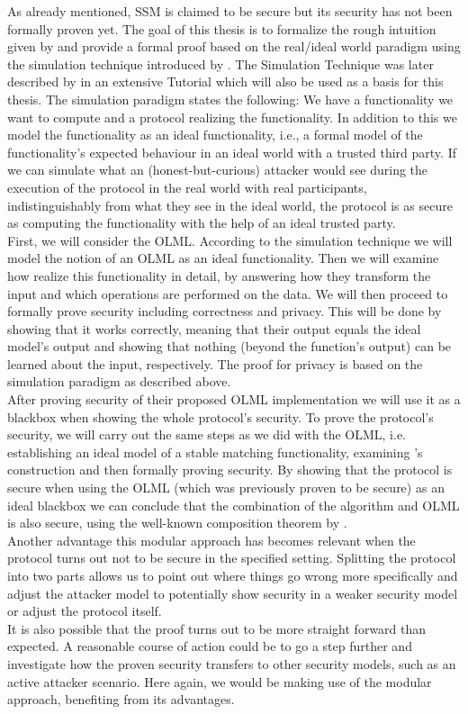 As already mentioned, SSM is claimed to be secure but its security has not been formally proven yet. The goal of this thesis is to formalize the rough intuition given by \citeauthor{smas} and provide a formal proof based on the real/ideal world paradigm using the simulation technique introduced by \citet{foc}. The Simulation Technique was later described by \citet{htsi} in an extensive Tutorial which will also be used as a basis for this thesis. The simulation paradigm states the following: We have a functionality we want to compute and a protocol realizing the functionality. In addition to this we model the functionality as an ideal functionality, i.e., a formal model of the functionality's expected behaviour in an ideal world with a trusted third party. If we can simulate what an (honest-but-curious) attacker would see during the execution of the protocol in the real world with real participants, indistinguishably from what they see in the ideal world, the protocol is as secure as computing the functionality with the help of an ideal trusted party.\\
First, we will consider the OLML. According to the simulation technique we will model the notion of an OLML as an ideal functionality. Then we will examine how \citeauthor{smas} realize this functionality in detail, by answering how they transform the input and which operations are performed on the data. We will then proceed to formally prove security including correctness and privacy. This will be done by showing that it works correctly, meaning that their output equals the ideal model's output and showing that nothing (beyond the function's output) can be learned about the input, respectively. The proof for privacy is based on the simulation paradigm as described above.\\
After proving security of their proposed OLML implementation we will use it as a blackbox when showing the whole protocol's security. To prove the protocol's security, we will carry out the same steps as we did with the OLML, i.e. establishing an ideal model of a stable matching functionality, examining \citeauthor{smas}'s construction and then formally proving security. By showing that the protocol is secure when using the OLML (which was previously proven to be secure) as an ideal blackbox we can conclude that the combination of the algorithm and OLML is also secure, using the well-known composition theorem by \citet{foc}.\\
Another advantage this modular approach has becomes relevant when the protocol turns out not to be secure in the specified setting. Splitting the protocol into two parts allows us to point out where things go wrong more specifically and adjust the attacker model to potentially show security in a weaker security model or adjust the protocol itself.\\
It is also possible that the proof turns out to be more straight forward than expected. A reasonable course of action could be to go a step further and investigate how the proven security transfers to other security models, such as an active attacker scenario. Here again, we would be making use of the modular approach, benefiting from its advantages.\\